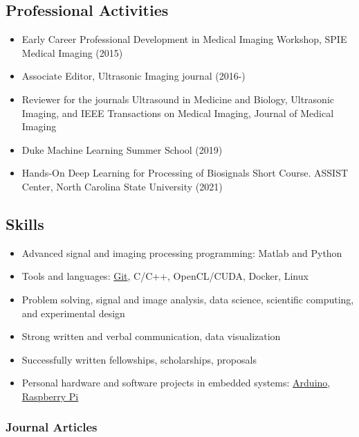 \documentclass[
]{article}
\providecommand{\tightlist}{%
  \setlength{\itemsep}{0pt}\setlength{\parskip}{0pt}}
\begin{document}
\hypertarget{professional-activities}{%
\subsection{Professional Activities}\label{professional-activities}}

\begin{itemize}
\tightlist
\item
  Early Career Professional Development in Medical Imaging Workshop,
  SPIE Medical Imaging (2015)
\item
  Associate Editor, Ultrasonic Imaging journal (2016-)
\item
  Reviewer for the journals Ultrasound in Medicine and Biology,
  Ultrasonic Imaging, and IEEE Transactions on Medical Imaging, Journal
  of Medical Imaging
\item
  Duke Machine Learning Summer School (2019)
\item
  Hands-On Deep Learning for Processing of Biosignals Short Course.
  ASSIST Center, North Carolina State University (2021)
\end{itemize}

\hypertarget{skills}{%
\subsection{Skills}\label{skills}}

\begin{itemize}
\tightlist
\item
  Advanced signal and imaging processing programming: Matlab and Python
\item
  Tools and languages: \href{http://git-scm.com/}{Git}, C/C++,
  OpenCL/CUDA, Docker, Linux
\item
  Problem solving, signal and image analysis, data science, scientific
  computing, and experimental design
\item
  Strong written and verbal communication, data visualization
\item
  Successfully written fellowships, scholarships, proposals
\item
  Personal hardware and software projects in embedded systems:
  \href{http://www.arduino.cc/}{Arduino},
  \href{http://www.raspberrypi.org/}{Raspberry Pi}
\end{itemize}

\hypertarget{journal-articles}{%
\subsubsection{Journal Articles}\label{journal-articles}}
\end{document}
